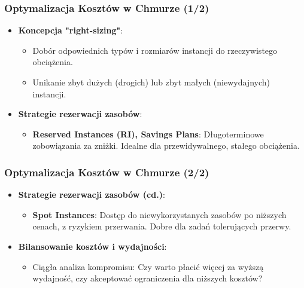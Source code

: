 \documentclass[aspectratio=169,xcolor=table]{beamer}
\begin{document}
\begin{frame}
  \frametitle{Optymalizacja Kosztów w Chmurze (1/2)}
  \begin{itemize}
    \item \textbf{Koncepcja "right-sizing"}:
        \begin{itemize}
            \item Dobór odpowiednich typów i rozmiarów instancji do rzeczywistego obciążenia.
            \item Unikanie zbyt dużych (drogich) lub zbyt małych (niewydajnych) instancji.
        \end{itemize}
    \item \textbf{Strategie rezerwacji zasobów}:
        \begin{itemize}
            \item \textbf{Reserved Instances (RI), Savings Plans}: Długoterminowe zobowiązania za zniżki. Idealne dla przewidywalnego, stałego obciążenia.
        \end{itemize}
  \end{itemize}
\end{frame}

\begin{frame}
  \frametitle{Optymalizacja Kosztów w Chmurze (2/2)}
  \begin{itemize}
    \item \textbf{Strategie rezerwacji zasobów (cd.)}:
        \begin{itemize}
            \item \textbf{Spot Instances}: Dostęp do niewykorzystanych zasobów po niższych cenach, z ryzykiem przerwania. Dobre dla zadań tolerujących przerwy.
        \end{itemize}
    \item \textbf{Bilansowanie kosztów i wydajności}:
        \begin{itemize}
            \item Ciągła analiza kompromisu: Czy warto płacić więcej za wyższą wydajność, czy akceptować ograniczenia dla niższych kosztów?
        \end{itemize}
  \end{itemize}
\end{frame}
\end{document}
